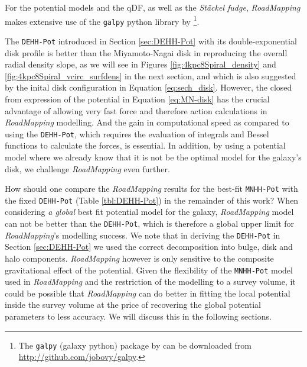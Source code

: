 \documentclass[iop,revtex4,numberedappendix,appendixfloats]{emulateapj}
\newcommand{\RM}{{\sl RoadMapping}}
\begin{document}
For the potential models and the qDF, as well as the  \emph{St\"{a}ckel fudge}, \RM{} makes extensive use of the \texttt{galpy} python library by \citet{2015ApJS..216...29B}\footnote{The \texttt{galpy} (galaxy python) package by \citet{2015ApJS..216...29B} can be downloaded from \url{http://github.com/jobovy/galpy}.}.

The \texttt{DEHH-Pot} introduced in Section \ref{sec:DEHH-Pot} with its double-exponential disk profile is better than the Miyamoto-Nagai disk in reproducing the overall radial density slope, as we will see in Figures \ref{fig:4kpc8Spiral_density} and \ref{fig:4kpc8Spiral_vcirc_surfdens} in the next section, and which is also suggested by the inital disk configuration in Equation \ref{eq:sech_disk}. However, the closed from expression of the potential in Equation \eqref{eq:MN-disk} has the crucial advantage of allowing very fast force and therefore action calculations in \RM{} modelling. And the gain in computational speed as compared to using the \texttt{DEHH-Pot}, which requires the evaluation of integrals and Bessel functions to calculate the forces, is essential. In addition, by using a potential model where we already know that it is not be the optimal model for the galaxy's disk, we challenge \RM{} even further.

How should one compare the \RM{} results for the best-fit \texttt{MNHH-Pot} with the fixed \texttt{DEHH-Pot} (Table \ref{tbl:DEHH-Pot}) in the remainder of this work? When considering \emph{a global} best fit potential model for the galaxy, \RM{} model can not be better than the \texttt{DEHH-Pot}, which is therefore a global upper limit for \RM{}'s modelling success. We note that in deriving the \texttt{DEHH-Pot} in Section \ref{sec:DEHH-Pot} we used the correct decomposition into bulge, disk and halo components. \RM{} however is only sensitive to the composite gravitational effect of the potential. Given the flexibility of the \texttt{MNHH-Pot} model used in \RM{} and the restriction of the modelling to a survey volume, it could be possible that \RM{} can do better in fitting the local potential inside the survey volume at the price of recovering the global potential parameters to less accuracy. We will discuss this in the following sections.

\end{document}
